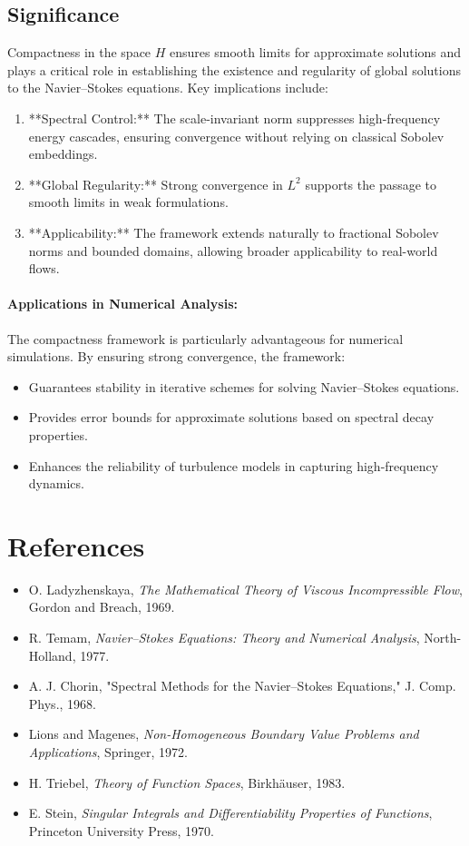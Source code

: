 \documentclass[12pt]{article}
\theoremstyle{definition}
\begin{document}
\subsection{Significance}
Compactness in the space $H$ ensures smooth limits for approximate solutions and plays a critical role in establishing the existence and regularity of global solutions to the Navier--Stokes equations. Key implications include:
\begin{enumerate}
    \item **Spectral Control:** The scale-invariant norm suppresses high-frequency energy cascades, ensuring convergence without relying on classical Sobolev embeddings.
    \item **Global Regularity:** Strong convergence in $L^2$ supports the passage to smooth limits in weak formulations.
    \item **Applicability:** The framework extends naturally to fractional Sobolev norms and bounded domains, allowing broader applicability to real-world flows.
\end{enumerate}

\paragraph{Applications in Numerical Analysis:}
The compactness framework is particularly advantageous for numerical simulations. By ensuring strong convergence, the framework:
\begin{itemize}
    \item Guarantees stability in iterative schemes for solving Navier--Stokes equations.
    \item Provides error bounds for approximate solutions based on spectral decay properties.
    \item Enhances the reliability of turbulence models in capturing high-frequency dynamics.
\end{itemize}

\section*{References}
\begin{itemize}
    \item O. Ladyzhenskaya, \emph{The Mathematical Theory of Viscous Incompressible Flow}, Gordon and Breach, 1969.
    \item R. Temam, \emph{Navier--Stokes Equations: Theory and Numerical Analysis}, North-Holland, 1977.
    \item A. J. Chorin, "Spectral Methods for the Navier--Stokes Equations," J. Comp. Phys., 1968.
    \item Lions and Magenes, \emph{Non-Homogeneous Boundary Value Problems and Applications}, Springer, 1972.
    \item H. Triebel, \emph{Theory of Function Spaces}, Birkh\"auser, 1983.
    \item E. Stein, \emph{Singular Integrals and Differentiability Properties of Functions}, Princeton University Press, 1970.
\end{itemize}
\end{document}
